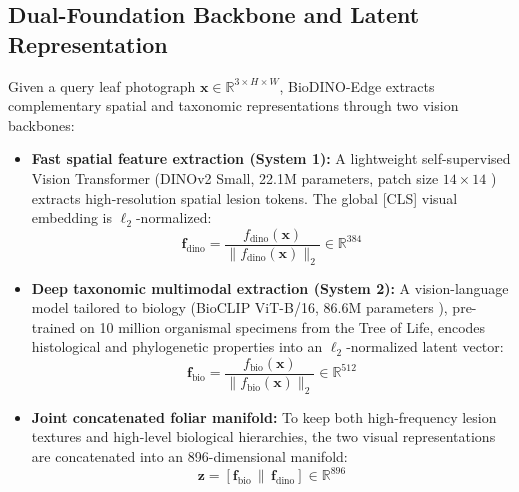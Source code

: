 \documentclass[conference]{IEEEtran}
\begin{document}
\subsection{Dual-Foundation Backbone and Latent Representation}
Given a query leaf photograph $\mathbf{x} \in \mathbb{R}^{3 \times H \times W}$, BioDINO-Edge extracts complementary spatial and taxonomic representations through two vision backbones:
\begin{itemize}
    \item \textbf{Fast spatial feature extraction (System 1):} A lightweight self-supervised Vision Transformer (DINOv2 Small, 22.1M parameters, patch size $14 \times 14$ \cite{oquab2023dinov2}) extracts high-resolution spatial lesion tokens. The global [CLS] visual embedding is $\ell_2$-normalized:
    \begin{equation}
    \mathbf{f}_{\text{dino}} = \frac{f_{\text{dino}}(\mathbf{x})}{\|f_{\text{dino}}(\mathbf{x})\|_2} \in \mathbb{R}^{384}
    \end{equation}
    \item \textbf{Deep taxonomic multimodal extraction (System 2):} A vision-language model tailored to biology (BioCLIP ViT-B/16, 86.6M parameters \cite{stevens2024bioclip}), pre-trained on 10 million organismal specimens from the Tree of Life, encodes histological and phylogenetic properties into an $\ell_2$-normalized latent vector:
    \begin{equation}
    \mathbf{f}_{\text{bio}} = \frac{f_{\text{bio}}(\mathbf{x})}{\|f_{\text{bio}}(\mathbf{x})\|_2} \in \mathbb{R}^{512}
    \end{equation}
    \item \textbf{Joint concatenated foliar manifold:} To keep both high-frequency lesion textures and high-level biological hierarchies, the two visual representations are concatenated into an 896-dimensional manifold:
    \begin{equation}
    \mathbf{z} = \left[\mathbf{f}_{\text{bio}} \,\|\, \mathbf{f}_{\text{dino}}\right] \in \mathbb{R}^{896}
    \end{equation}
\end{itemize}
\end{document}
